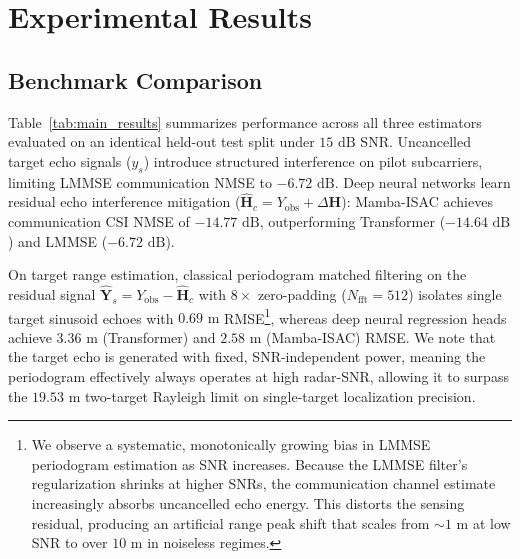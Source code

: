 \documentclass[conference]{IEEEtran}
\begin{document}
\section{Experimental Results}

\begin{table}[ht]
\caption{Main Benchmark Accuracy and Compute (15 dB SNR, Mean $\pm$ Std across 3 Seeds)}
\label{tab:main_results}
\centering
{}
\end{table}

\subsection{Benchmark Comparison}
Table~\ref{tab:main_results} summarizes performance across all three estimators evaluated on an identical held-out test split under $15\text{ dB}$ SNR. Uncancelled target echo signals ($y_s$) introduce structured interference on pilot subcarriers, limiting LMMSE communication NMSE to $-6.72\text{ dB}$. Deep neural networks learn residual echo interference mitigation ($\hat{\mathbf{H}}_c = Y_{\text{obs}} + \Delta \mathbf{H}$): Mamba-ISAC achieves communication CSI NMSE of $-14.77\text{ dB}$, outperforming Transformer ($-14.64\text{ dB}$) and LMMSE ($-6.72\text{ dB}$).

On target range estimation, classical periodogram matched filtering on the residual signal $\hat{\mathbf{Y}}_s = Y_{\text{obs}} - \hat{\mathbf{H}}_c$ with $8\times$ zero-padding ($N_{\text{fft}} = 512$) isolates single target sinusoid echoes with $0.69\text{ m}$ RMSE\footnote{We observe a systematic, monotonically growing bias in LMMSE periodogram estimation as SNR increases. Because the LMMSE filter's regularization shrinks at higher SNRs, the communication channel estimate increasingly absorbs uncancelled echo energy. This distorts the sensing residual, producing an artificial range peak shift that scales from $\sim 1\text{ m}$ at low SNR to over $10\text{ m}$ in noiseless regimes.}, whereas deep neural regression heads achieve $3.36\text{ m}$ (Transformer) and $2.58\text{ m}$ (Mamba-ISAC) RMSE. We note that the target echo is generated with fixed, SNR-independent power, meaning the periodogram effectively always operates at high radar-SNR, allowing it to surpass the $19.53\text{ m}$ two-target Rayleigh limit on single-target localization precision.
\end{document}
